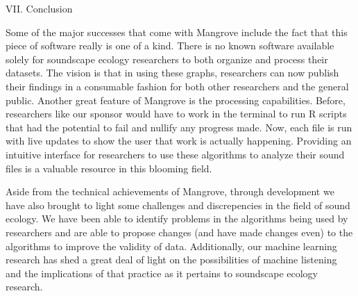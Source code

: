 \begin{center}
VII. Conclusion
\end{center}
\begin{flushleft}
\setlength{\parindent}{0.125in}
Some of the major successes that come with Mangrove include the fact that this piece of software really is one of a kind. There is no known software available solely for soundscape ecology researchers to both organize and process their datasets. The vision is that in using these graphs, researchers can now publish their findings in a consumable fashion for both other researchers and the general public. Another great feature of Mangrove is the processing capabilities. Before, researchers like our sponsor would have to work in the terminal to run R scripts that had the potential to fail and nullify any progress made. Now, each file is run with live updates to show the user that work is actually happening. Providing an intuitive interface for researchers to use these algorithms to analyze their sound files is a valuable resource in this blooming field.\par
Aside from the technical achievements of Mangrove, through development we have also brought to light some challenges and discrepencies in the field of sound ecology. We have been able to identify problems in the algorithms being used by researchers and are able to propose changes (and have made changes even) to the algorithms to improve the validity of data. Additionally, our machine learning research has shed a great deal of light on the possibilities of machine listening and the implications of that practice as it pertains to soundscape ecology research.\par
\end{flushleft}
